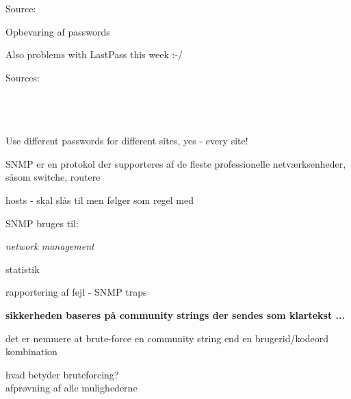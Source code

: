 \documentclass[20pt,landscape,a4paper,footrule]{foils}
\begin{document}
Source:\\




\centerline{Opbevaring af passwords}

\vskip 1cm
\centerline{Also problems with LastPass this week :-/}




 Sources:\\
{\footnotesize{}\\
\\
\\
}

\vskip 5mm
\centerline{Use different passwords for different sites, yes - every site!}


\begin{list1}
\item SNMP er en protokol der supporteres af de fleste professionelle
  netværksenheder, såsom switche, routere
\item hosts - skal slås til men følger som regel med
\item SNMP bruges til:
  \begin{list2}
    \item \emph{network management}
    \item statistik
    \item rapportering af fejl - SNMP traps
  \end{list2}
\item {\bfseries sikkerheden baseres på community strings der sendes
    som klartekst ...}
\item det er nemmere at brute-force en community string end en
  brugerid/kodeord kombination
\end{list1}


\begin{list1}
\item hvad betyder bruteforcing?\\
afprøvning af alle mulighederne
\end{list1}
\end{document}

